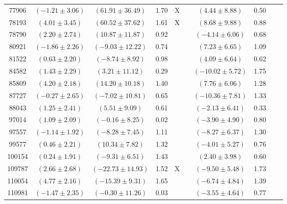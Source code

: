 \documentclass [10pt, twoside] {uwthesis}[2012/04/02]
\begin{document}
{\begin{longtable}[t]{|c|c|cccc|cccc|}
77906	&  $(	-1.21	  \pm  	3.06	)$  &  $(	61.91	  \pm  	36.49	)$  &  	1.70	  &  	X	  &  		  &  $(	4.44	  \pm  	8.88	)$  &  	0.50	  &  		  &  		  \\
78193	&  $(	4.01	  \pm  	3.45	)$  &  $(	60.52	  \pm  	37.62	)$  &  	1.61	  &  	X	  &  		  &  $(	8.68	  \pm  	9.88	)$  &  	0.88	  &  		  &  		  \\
78790	&  $(	2.20	  \pm  	2.74	)$  &  $(	10.87	  \pm  	11.87	)$  &  	0.92	  &  		  &  		  &  $(	-4.14	  \pm  	6.06	)$  &  	0.68	  &  		  &  		  \\
80921	&  $(	-1.86	  \pm  	2.26	)$  &  $(	-9.03	  \pm  	12.22	)$  &  	0.74	  &  		  &  		  &  $(	7.23	  \pm  	6.65	)$  &  	1.09	  &  		  &  		  \\
81522	&  $(	0.63	  \pm  	2.20	)$  &  $(	-8.74	  \pm  	8.92	)$  &  	0.98	  &  		  &  		  &  $(	4.09	  \pm  	6.64	)$  &  	0.62	  &  		  &  		  \\
84582	&  $(	1.43	  \pm  	2.29	)$  &  $(	3.21	  \pm  	11.12	)$  &  	0.29	  &  		  &  		  &  $(	-10.02	  \pm  	5.72	)$  &  	1.75	  &  		  &  		  \\
85809	&  $(	4.20	  \pm  	2.18	)$  &  $(	14.20	  \pm  	10.18	)$  &  	1.40	  &  		  &  		  &  $(	7.76	  \pm  	6.06	)$  &  	1.28	  &  		  &  		  \\
87727	&  $(	-0.27	  \pm  	2.65	)$  &  $(	-7.02	  \pm  	10.81	)$  &  	0.65	  &  		  &  		  &  $(	-10.36	  \pm  	7.81	)$  &  	1.33	  &  		  &  		  \\
88043	&  $(	1.25	  \pm  	2.41	)$  &  $(	5.51	  \pm  	9.09	)$  &  	0.61	  &  		  &  		  &  $(	-2.13	  \pm  	6.41	)$  &  	0.33	  &  		  &  		  \\
97014	&  $(	1.09	  \pm  	2.09	)$  &  $(	-0.16	  \pm  	8.25	)$  &  	0.02	  &  		  &  		  &  $(	-3.90	  \pm  	4.90	)$  &  	0.80	  &  		  &  		  \\
97557	&  $(	-1.14	  \pm  	1.92	)$  &  $(	-8.28	  \pm  	7.45	)$  &  	1.11	  &  		  &  		  &  $(	-8.27	  \pm  	6.37	)$  &  	1.30	  &  		  &  		  \\
99577	&  $(	0.46	  \pm  	2.21	)$  &  $(	10.34	  \pm  	7.82	)$  &  	1.32	  &  		  &  		  &  $(	-4.01	  \pm  	5.27	)$  &  	0.76	  &  		  &  		  \\
100154	&  $(	0.24	  \pm  	1.91	)$  &  $(	-9.31	  \pm  	6.51	)$  &  	1.43	  &  		  &  		  &  $(	2.40	  \pm  	3.98	)$  &  	0.60	  &  		  &  		  \\
109787	&  $(	2.66	  \pm  	2.68	)$  &  $(	-22.73	  \pm  	14.93	)$  &  	1.52	  &  	X	  &  		  &  $(	-9.50	  \pm  	5.48	)$  &  	1.73	  &  		  &  		  \\
110054	&  $(	4.77	  \pm  	2.16	)$  &  $(	-15.39	  \pm  	9.31	)$  &  	1.65	  &  		  &  		  &  $(	-6.74	  \pm  	4.84	)$  &  	1.39	  &  		  &  		  \\
110981	&  $(	-1.47	  \pm  	2.35	)$  &  $(	-0.30	  \pm  	11.26	)$  &  	0.03	  &  		  &  		  &  $(	-3.55	  \pm  	4.64	)$  &  	0.77	  &  		  &  		  \\  \hline 						\end{longtable}
}
\end{document}
